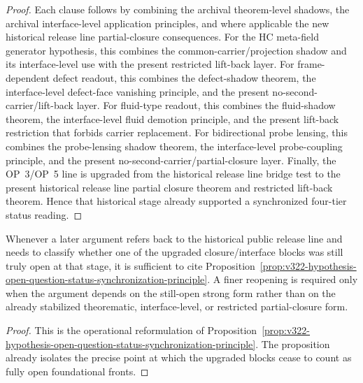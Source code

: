 \begin{proof}
Each clause follows by combining the archival theorem-level shadows, the archival interface-level application principles, and where applicable the new historical release line partial-closure consequences. For the HC meta-field generator hypothesis, this combines the common-carrier/projection shadow and its interface-level use with the present restricted lift-back layer. For frame-dependent defect readout, this combines the defect-shadow theorem, the interface-level defect-face vanishing principle, and the present no-second-carrier/lift-back layer. For fluid-type readout, this combines the fluid-shadow theorem, the interface-level fluid demotion principle, and the present lift-back restriction that forbids carrier replacement. For bidirectional probe lensing, this combines the probe-lensing shadow theorem, the interface-level probe-coupling principle, and the present no-second-carrier/partial-closure layer. Finally, the OP~3/OP~5 line is upgraded from the historical release line bridge test to the present historical release line partial closure theorem and restricted lift-back theorem. Hence that historical stage already supported a synchronized four-tier status reading.
\end{proof}

\begin{corollary}
\label{cor:use-rule-for-the-synchronized-v322-status-reading}
Whenever a later argument refers back to the historical public  release line and needs to classify whether one of the upgraded closure/interface blocks was still truly open at that stage, it is sufficient to cite Proposition~\ref{prop:v322-hypothesis-open-question-status-synchronization-principle}. A finer reopening is required only when the argument depends on the still-open strong form rather than on the already stabilized theorematic, interface-level, or restricted partial-closure form.
\end{corollary}

\begin{proof}
This is the operational reformulation of Proposition~\ref{prop:v322-hypothesis-open-question-status-synchronization-principle}. The proposition already isolates the precise point at which the upgraded blocks cease to count as fully open foundational fronts.
\end{proof}


